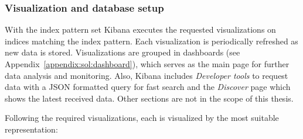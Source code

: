 \documentclass[12pt,a4paper,twoside]{book}
\begin{document}
            \subsubsection*{Visualization and database setup} \label{sol:design:elk:vis}
                With the index pattern set Kibana executes the requested visualizations on indices matching the index pattern. Each visualization is periodically refreshed as new data is stored. Visualizations are grouped in dashboards (see Appendix~\ref{appendix:sol:dashboard}), which serves as the main page for further data analysis and monitoring. Also, Kibana includes \emph{Developer tools} to request data with a JSON formatted query for fast search and the \emph{Discover} page which shows the latest received data. Other sections are not in the scope of this thesis.\par
                Following the required visualizations, each is visualized by the most suitable representation:
\end{document}
